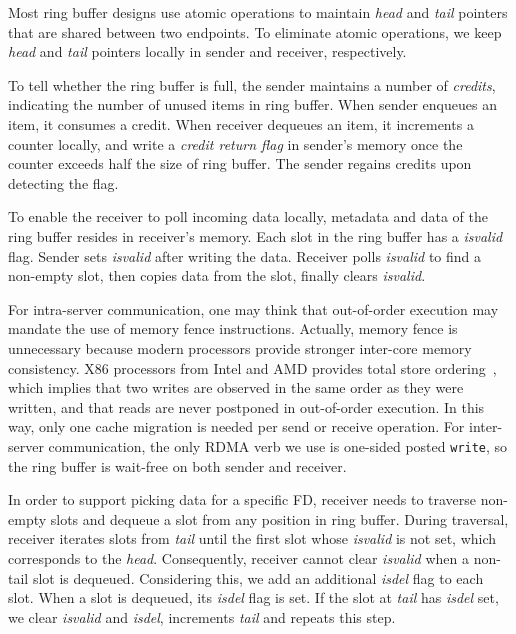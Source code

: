 Most ring buffer designs use atomic operations to maintain \textit{head} and \textit{tail} pointers that are shared between two endpoints. To eliminate atomic operations, we keep \textit{head} and \textit{tail} pointers locally in sender and receiver, respectively.

To tell whether the ring buffer is full, the sender maintains a number of \textit{credits}, indicating the number of unused items in ring buffer. When sender enqueues an item, it consumes a credit. When receiver dequeues an item, it increments a counter locally, and write a \textit{credit return flag} in sender's memory once the counter exceeds half the size of ring buffer. The sender regains credits upon detecting the flag.

To enable the receiver to poll incoming data locally, metadata and data of the ring buffer resides in receiver's memory. Each slot in the ring buffer has a \textit{isvalid} flag. Sender sets \textit{isvalid} after writing the data. Receiver polls \textit{isvalid} to find a non-empty slot, then copies data from the slot, finally clears \textit{isvalid}.

For intra-server communication, one may think that out-of-order execution may mandate the use of memory fence instructions. Actually, memory fence is unnecessary because modern processors provide stronger inter-core memory consistency. X86 processors from Intel and AMD provides total store ordering~\cite{sewell2010x86,intel-manual}, which implies that two writes are observed in the same order as they were written, and that reads are never postponed in out-of-order execution. In this way, only one cache migration is needed per send or receive operation. %
For inter-server communication, the only RDMA verb we use is one-sided posted \texttt{write}, so the ring buffer is wait-free on both sender and receiver.

In order to support picking data for a specific FD, receiver needs to traverse non-empty slots and dequeue a slot from any position in ring buffer. During traversal, receiver iterates slots from \textit{tail} until the first slot whose \textit{isvalid} is not set, which corresponds to the \textit{head}. Consequently, receiver cannot clear \textit{isvalid} when a non-tail slot is dequeued. Considering this, we add an additional \textit{isdel} flag to each slot. When a slot is dequeued, its \textit{isdel} flag is set. If the slot at \textit{tail} has \textit{isdel} set, we clear \textit{isvalid} and \textit{isdel}, increments \textit{tail} and repeats this step.



